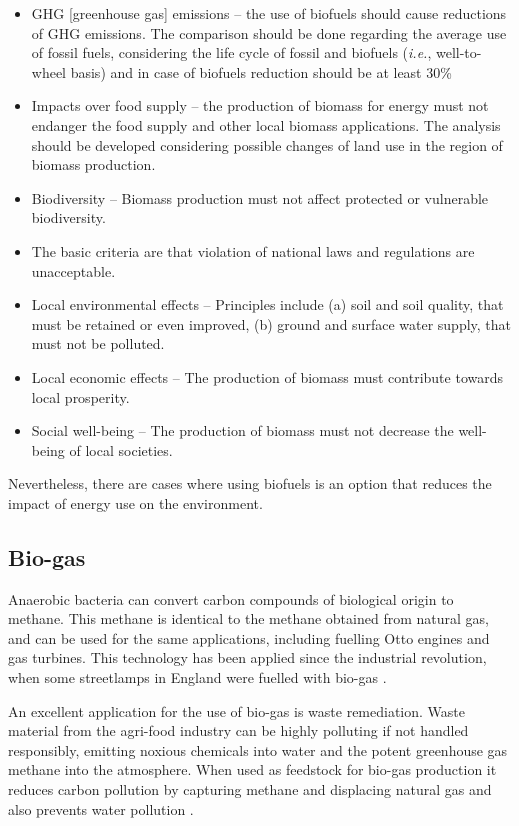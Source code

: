 {\itshape
\begin{itemize}
  \item GHG [greenhouse gas] emissions – the use of biofuels should cause reductions of GHG emissions. The
comparison should be done regarding the average use of fossil fuels, considering the life
cycle of fossil and biofuels (\textit{i.e.}, well-to-wheel basis) and in case of biofuels reduction
should be at least 30\%
 \item Impacts over food supply – the production of biomass for energy must not endanger the
food supply and other local biomass applications. The analysis should be developed
considering possible changes of land use in the region of biomass production.
 \item Biodiversity – Biomass production must not affect protected or vulnerable biodiversity.
 \item The basic criteria are that violation of national laws and regulations are unacceptable.
 \item Local environmental effects – Principles include (a) soil and soil quality, that must be
retained or even improved, (b) ground and surface water supply, that must not be polluted.
 \item Local economic effects – The production of biomass must contribute towards local
prosperity.
 \item  Social well-being – The production of biomass must not decrease the well-being of local societies. 
\end{itemize}
}

Nevertheless, there are cases where using biofuels is an option that reduces the
impact of energy use on the environment.

\subsection{Bio-gas}

Anaerobic bacteria can convert carbon compounds of biological origin to methane.
This methane is identical to the methane obtained from natural gas, and can be
used for the same applications, including fuelling Otto engines and gas
turbines. This technology has been applied since the industrial revolution, when
some streetlamps in England were fuelled with bio-gas \autocite[p.
448]{Klass1998}.

An excellent application for the use of bio-gas is waste remediation. Waste
material from the agri-food industry can be highly polluting if not handled
responsibly, emitting noxious chemicals into water and the potent greenhouse gas
methane into the atmosphere. When used as feedstock for bio-gas production it
reduces carbon pollution by capturing methane and displacing natural gas and
also prevents water pollution \autocite{Venter2014}.

